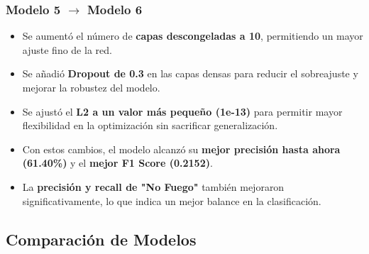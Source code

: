 \subsubsection{Modelo 5 $\rightarrow$ Modelo 6}
\begin{itemize}
    \item Se aumentó el número de \textbf{capas descongeladas a 10}, permitiendo un mayor ajuste fino de la red.
    \item Se añadió \textbf{Dropout de 0.3} en las capas densas para reducir el sobreajuste y mejorar la robustez del modelo.
    \item Se ajustó el \textbf{L2 a un valor más pequeño (1e-13)} para permitir mayor flexibilidad en la optimización sin sacrificar generalización.
    \item Con estos cambios, el modelo alcanzó su \textbf{mejor precisión hasta ahora (61.40\%)} y el \textbf{mejor F1 Score (0.2152)}.
    \item La \textbf{precisión y recall de "No Fuego"} también mejoraron significativamente, lo que indica un mejor balance en la clasificación.
\end{itemize}

\subsection{Comparación de Modelos}

\begin{table}[h]
    \centering
    \renewcommand{\arraystretch}{1.3}
    \caption{Comparación de métricas de evaluación entre diferentes modelos entrenados.}
    \label{tab:evaluation_metrics}
\end{table}


